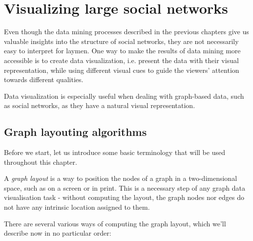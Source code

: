 \chapter{Visualizing large social networks}

Even though the data mining processes described in the previous chapters give us valuable insights into the structure of social networks, they are not necessarily easy to interpret for laymen.
One way to make the results of data mining more accessible is to create data visualization, i.e. present the data with their visual representation, 
while using different visual cues to guide the viewers' attention towards different qualities.

Data visualization is especially useful when dealing with graph-based data, such as social networks, as they have a natural visual representation.

\section{Graph layouting algorithms}

Before we start, let us introduce some basic terminology that will be used throughout this chapter.

A \emph{graph layout} is a way to position the nodes of a graph in a two-dimensional space, such as on a screen or in print. 
This is a necessary step of any graph data visualisation task - without computing the layout, the graph nodes nor edges do not have any intrinsic location assigned to them.

There are several various ways of computing the graph layout, which we'll describe now in no particular order:

